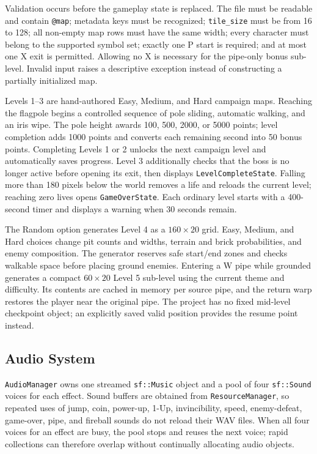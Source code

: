 \documentclass{template}
\begin{document}
Validation occurs before the gameplay state is replaced. The file must be
readable and contain \texttt{@map}; metadata keys must be recognized;
\texttt{tile\_size} must be from 16 to 128; all non-empty map rows must have the
same width; every character must belong to the supported symbol set; exactly
one P start is required; and at most one X exit is permitted. Allowing no X is
necessary for the pipe-only bonus sub-level. Invalid input raises a descriptive
exception instead of constructing a partially initialized map.

Levels 1--3 are hand-authored Easy, Medium, and Hard campaign maps. Reaching
the flagpole begins a controlled sequence of pole sliding, automatic walking,
and an iris wipe. The pole height awards 100, 500, 2000, or 5000 points; level
completion adds 1000 points and converts each remaining second into 50 bonus
points. Completing Levels 1 or 2 unlocks the next campaign level and
automatically saves progress. Level 3 additionally checks that the boss is no
longer active before opening its exit, then displays \texttt{LevelCompleteState}.
Falling more than 180 pixels below the world removes a life and reloads the
current level; reaching zero lives opens \texttt{GameOverState}. Each ordinary
level starts with a 400-second timer and displays a warning when 30 seconds
remain.

The Random option generates Level 4 as a $160\times20$ grid. Easy, Medium, and
Hard choices change pit counts and widths, terrain and brick probabilities,
and enemy composition. The generator reserves safe start/end zones and checks
walkable space before placing ground enemies. Entering a W pipe while grounded
generates a compact $60\times20$ Level 5 sub-level using the current theme and
difficulty. Its contents are cached in memory per source pipe, and the return
warp restores the player near the original pipe. The project has no fixed
mid-level checkpoint object; an explicitly saved valid position provides the
resume point instead.

\subsection{Audio System}

\texttt{AudioManager} owns one streamed \texttt{sf::Music} object and a pool of
four \texttt{sf::Sound} voices for each effect. Sound buffers are obtained from
\texttt{ResourceManager}, so repeated uses of jump, coin, power-up, 1-Up,
invincibility, speed, enemy-defeat, game-over, pipe, and fireball sounds do not
reload their WAV files. When all four voices for an effect are busy, the pool
stops and reuses the next voice; rapid collections can therefore overlap
without continually allocating audio objects.
\end{document}
